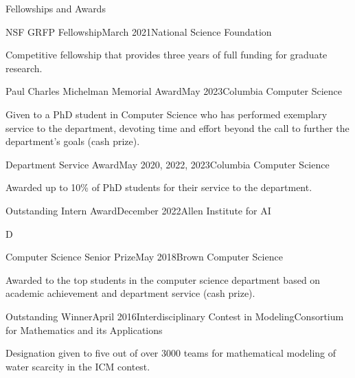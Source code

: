 \documentclass{cv} %
\begin{document}
\begin{rSection}{Fellowships and Awards} \itemsep -2pt

\begin{rSubsection}{NSF GRFP Fellowship}{March 2021}{National Science Foundation}{}
\item Competitive fellowship that provides three years of full funding for graduate research.
\end{rSubsection}

\begin{rSubsection}{Paul Charles Michelman Memorial Award}{May 2023}{Columbia Computer Science}{}
\item Given to a PhD student in Computer Science who has performed exemplary service to the department, devoting time and effort beyond the call to further the department’s goals (cash prize).
\end{rSubsection}

\begin{rSubsection}{Department Service Award}{May 2020, 2022, 2023}{Columbia Computer Science}{}
\item Awarded up to 10\% of PhD students for their service to the department.
\end{rSubsection}

\begin{rSubsection}{Outstanding Intern Award}{December 2022}{Allen Institute for AI}{}
\item D
\end{rSubsection}

\begin{rSubsection}{Computer Science Senior Prize}{May 2018}{Brown Computer Science}{}
\item Awarded to the top students in the computer science department based on academic achievement and department service (cash prize).
\end{rSubsection}

\begin{rSubsection}{Outstanding Winner}{April 2016}{Interdisciplinary Contest in Modeling}{Consortium for Mathematics and its Applications}
\item Designation given to five out of over 3000 teams for mathematical modeling of water scarcity in the ICM contest.
\end{rSubsection}

\end{rSection}
\end{document}

